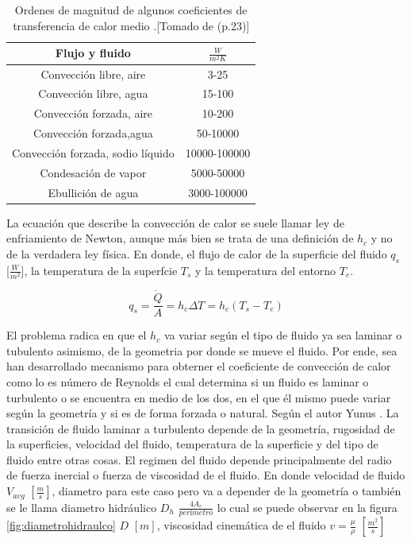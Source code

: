 \documentclass[12pt,letterpaper]{article}     %
\begin{document}
\begin{table} [!ht]
\caption{Ordenes de magnitud de algunos coeficientes de transferencia de calor medio .[Tomado de \cite{Mills}(p.23)]}

\label{Tab:valoresde hc}
\begin{center}
\begin{tabular}{| c | c | }
\hline

\cline{1-2}
\textbf{Flujo y fluido} & \textbf{$\frac{W}{m^2K}$} \\
\hline 

Convección libre, aire & 3-25  \\
\hline
Convección libre, agua & 15-100   \\
\hline
Convección forzada, aire & 10-200  \\
\hline
Convección forzada,agua & 50-10000  \\
\hline
Convección forzada, sodio líquido & 10000-100000  \\
\hline
Condesación de vapor & 5000-50000  \\
\hline
Ebullición de agua & 3000-100000  \\
\hline
\end{tabular}
\end{center}
\end{table}

La ecuación que describe la convección de calor se suele llamar ley de enfriamiento de Newton, aunque más bien se trata de una definición de $h_{c}$ y no de la verdadera ley física. En donde, el flujo de calor de la superficie del fluido  $q_{s}$ [$\frac{W}{m^2}$], la temperatura de la superfcie $T_{s}$ y la temperatura del entorno $T_{e}$.

\begin{equation}
    q_{s} = \frac{\dot{Q}}{A} = h_{c}\Delta T = h_{c}(T_{s}-T_{e})
    \label{eq:ecuaciondeconvección}
\end{equation}

El problema radica en que el $h_{c}$ va variar según el tipo de fluido ya sea laminar o tubulento asimismo, de la geometria por donde se mueve el fluido. Por ende, sea han desarrollado mecanismo para obterner el coeficiente de convección de calor como lo es número de Reynolds el cual determina si un fluido es laminar o turbulento o se encuentra en medio de los dos, en el que él mismo puede variar según la geometría y si es de forma forzada o natural. Según el autor Yunus \cite[p\ 540]{yunus}. La transición de fluido laminar a turbulento depende de la geometría, rugosidad de la superficies, velocidad del fluido, temperatura de la superficie y del tipo de fluido entre otras cosas.
El regimen del fluido depende principalmente del radio de fuerza inercial o fuerza de viscosidad de el fluido. En donde   velocidad de fluido $V_{avg}$ $[\frac{m}{s}]$, diametro para este caso pero va a depender de la geometría o también se le llama diametro hidráulico $D_{h}$ $\frac{4A_{c}}{perímetro}$ lo cual se puede observar en la figura \ref{fig:diametrohidraulco} $ D $ $[m]$, viscosidad cinemática de el fluido $v =\frac{\mu}{\rho}$ $[\frac{m^2}{s}]$
\end{document}
